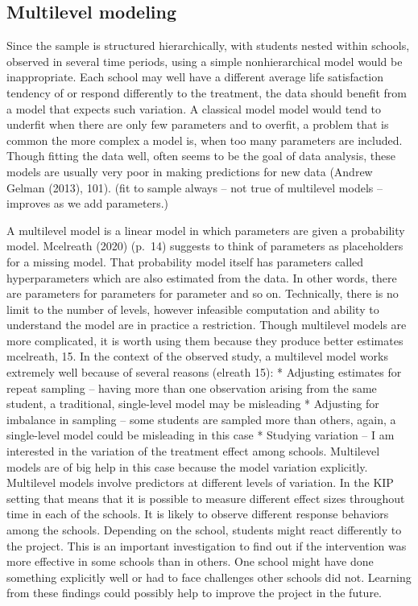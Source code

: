 \documentclass[a4, 12pt]{article}
\begin{document}
\hypertarget{multilevel-modeling}{%
\subsection{Multilevel modeling}\label{multilevel-modeling}}

Since the sample is structured hierarchically, with students nested within schools, observed in several time periods, using a simple nonhierarchical model would be inappropriate. Each school may well have a different average life satisfaction tendency of or respond differently to the treatment, the data should benefit from a model that expects such variation. A classical model model would tend to underfit when there are only few parameters and to overfit, a problem that is common the more complex a model is, when too many parameters are included. Though fitting the data well, often seems to be the goal of data analysis, these models are usually very poor in making predictions for new data (Andrew Gelman (2013), 101). (fit to sample always -- not true of multilevel models -- improves as we add parameters.)

A multilevel model is a linear model in which parameters are given a probability model. Mcelreath (2020) (p.~14) suggests to think of parameters as placeholders for a missing model. That probability model itself has parameters called hyperparameters which are also estimated from the data. In other words, there are parameters for parameters for parameter and so on. Technically, there is no limit to the number of levels, however infeasible computation and ability to understand the model are in practice a restriction. Though multilevel models are more complicated, it is worth using them because they produce better estimates mcelreath, 15. In the context of the observed study, a multilevel model works extremely well because of several reasons (elreath 15):
* Adjusting estimates for repeat sampling -- having more than one observation arising from the same student, a traditional, single-level model may be misleading
* Adjusting for imbalance in sampling -- some students are sampled more than others, again, a single-level model could be misleading in this case
* Studying variation -- I am interested in the variation of the treatment effect among schools. Multilevel models are of big help in this case because the model variation explicitly.
Multilevel models involve predictors at different levels of variation. In the KIP setting that means that it is possible to measure different effect sizes throughout time in each of the schools. It is likely to observe different response behaviors among the schools. Depending on the school, students might react differently to the project. This is an important investigation to find out if the intervention was more effective in some schools than in others. One school might have done something explicitly well or had to face challenges other schools did not. Learning from these findings could possibly help to improve the project in the future.
\end{document}
